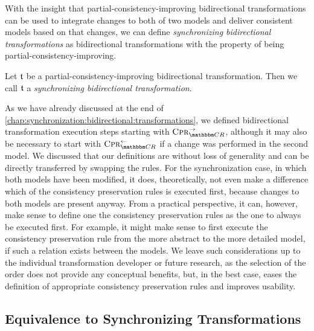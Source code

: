 With the insight that partial-consistency-improving bidirectional transformations can be used to integrate changes to both of two models and deliver consistent models based on that changes, we can define \emph{synchronizing bidirectional transformations} as bidirectional transformations with the property of being partial-consistency-improving.

\begin{definition}
    Let $\mathfrak{t}$ be a partial-consistency-improving bidirectional transformation.
    Then we call $\mathfrak{t}$ a \emph{synchronizing bidirectional transformation}.
\end{definition}

As we have already discussed at the end of \autoref{chap:synchronization:bidirectional:transformations}, we defined bidirectional transformation execution steps starting with $\consistencypreservationrule{\consistencyrelationset{CR}}^{\rightarrow}$, although it may also be necessary to start with $\consistencypreservationrule{\consistencyrelationset{CR}}^{\leftarrow}$ if a change was performed in the second model.
We discussed that our definitions are without loss of generality and can be directly transferred by swapping the rules.
For the synchronization case, in which both models have been modified, it does, theoretically, not even make a difference which of the consistency preservation rules is executed first, because changes to both models are present anyway.
From a practical perspective, it can, however, make sense to define one the consistency preservation rules as the one to always be executed first.
For example, it might make sense to first execute the consistency preservation rule from the more abstract to the more detailed model, if such a relation exists between the models.
We leave such considerations up to the individual transformation developer or future research, as the selection of the order does not provide any conceptual benefits, but, in the best case, eases the definition of appropriate consistency preservation rules and improves usability.



\subsection{Equivalence to Synchronizing Transformations}

